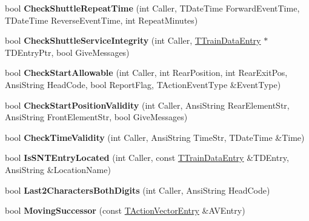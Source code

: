 \begin{DoxyCompactItemize}
\mbox{\label{class_t_train_controller_afe4a83b3b7ba6daa955ce5617d509d51}} 
bool {\bfseries Check\+Shuttle\+Repeat\+Time} (int Caller, T\+Date\+Time Forward\+Event\+Time, T\+Date\+Time Reverse\+Event\+Time, int Repeat\+Minutes)
\item 
\mbox{\label{class_t_train_controller_a161fe7b4bbf101fc0a3f7eadd3aff9ca}} 
bool {\bfseries Check\+Shuttle\+Service\+Integrity} (int Caller, \mbox{\hyperlink{class_t_train_data_entry}{T\+Train\+Data\+Entry}} $\ast$T\+D\+Entry\+Ptr, bool Give\+Messages)
\item 
\mbox{\label{class_t_train_controller_ab8d8cf015d4784f12585f0ead325e9bf}} 
bool {\bfseries Check\+Start\+Allowable} (int Caller, int Rear\+Position, int Rear\+Exit\+Pos, Ansi\+String Head\+Code, bool Report\+Flag, T\+Action\+Event\+Type \&Event\+Type)
\item 
\mbox{\label{class_t_train_controller_a5c9711cc69c8332cf7db5e0b2696ca45}} 
bool {\bfseries Check\+Start\+Position\+Validity} (int Caller, Ansi\+String Rear\+Element\+Str, Ansi\+String Front\+Element\+Str, bool Give\+Messages)
\item 
\mbox{\label{class_t_train_controller_a523077cf0c9c02c8cb56dab0af9b0e52}} 
bool {\bfseries Check\+Time\+Validity} (int Caller, Ansi\+String Time\+Str, T\+Date\+Time \&Time)
\item 
\mbox{\label{class_t_train_controller_a61cdbf0085d24c76aa84e7d5e1d11ead}} 
bool {\bfseries Is\+S\+N\+T\+Entry\+Located} (int Caller, const \mbox{\hyperlink{class_t_train_data_entry}{T\+Train\+Data\+Entry}} \&T\+D\+Entry, Ansi\+String \&Location\+Name)
\item 
\mbox{\label{class_t_train_controller_a6fc210d266e7672ccc648c0a9ab4e542}} 
bool {\bfseries Last2\+Characters\+Both\+Digits} (int Caller, Ansi\+String Head\+Code)
\item 
\mbox{\label{class_t_train_controller_ae6c929171fa673b87e68694e6f48985d}} 
bool {\bfseries Moving\+Successor} (const \mbox{\hyperlink{class_t_action_vector_entry}{T\+Action\+Vector\+Entry}} \&A\+V\+Entry)

\end{DoxyCompactItemize}
